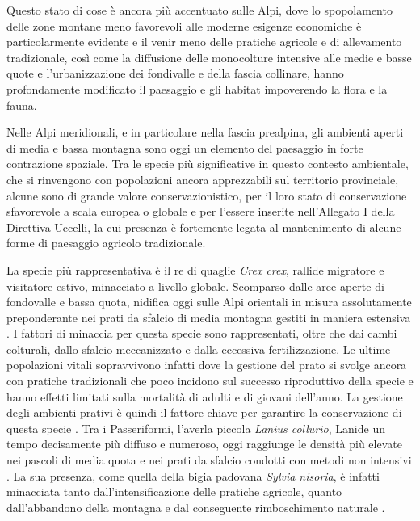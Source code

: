 \documentclass[10pt,twoside,openany,x11names,svgnames,italian,a5paper,dvipsnames,table]{memoir}
\begin{document}
Questo stato di cose è ancora più accentuato sulle Alpi, dove lo spopolamento delle zone montane meno favorevoli alle moderne esigenze economiche è particolarmente evidente e il venir meno delle pratiche agricole e di allevamento
tradizionale, così come la diffusione delle monocolture intensive alle medie e basse quote e l’urbanizzazione dei fondivalle e della fascia collinare, hanno profondamente modificato il paesaggio e gli habitat impoverendo la flora e la fauna.

 Nelle Alpi meridionali, e in particolare nella fascia prealpina, gli ambienti aperti di media e bassa montagna sono oggi un elemento del paesaggio in forte contrazione spaziale. Tra le specie più significative in questo contesto ambientale, che si rinvengono con popolazioni ancora apprezzabili sul territorio provinciale, alcune sono di grande valore conservazionistico, per il loro stato di conservazione sfavorevole a scala europea o globale e per l'essere inserite nell'Allegato I della Direttiva Uccelli, la cui presenza è fortemente legata al mantenimento di alcune forme di paesaggio agricolo tradizionale. 

La specie più rappresentativa è il re di quaglie \emph{Crex crex}, rallide migratore e visitatore estivo, minacciato a livello globale. Scomparso dalle aree aperte di fondovalle e bassa quota, nidifica oggi sulle Alpi orientali in misura assolutamente preponderante nei prati da sfalcio di media montagna gestiti in maniera estensiva \cite{Pedrini02} \cite{Pedrini05} \cite{Pedrini12}. I fattori di minaccia per questa specie sono rappresentati, oltre che dai cambi colturali, dallo sfalcio meccanizzato e dalla eccessiva fertilizzazione. Le ultime popolazioni vitali sopravvivono infatti dove la gestione del prato si svolge ancora con pratiche tradizionali che poco incidono sul successo riproduttivo della specie e hanno effetti limitati sulla mortalità di adulti e di giovani dell’anno. La gestione degli ambienti prativi è quindi il fattore chiave per garantire la conservazione di questa specie \cite{Broyer96} \cite{Crockford96} \cite{Brambilla13}. Tra i Passeriformi, l’averla piccola \emph{Lanius collurio}, Lanide un tempo decisamente più diffuso e numeroso, oggi raggiunge le densità più elevate nei pascoli di media quota e nei prati da sfalcio condotti con metodi non intensivi \cite{Brambilla09}. La sua presenza, come quella della bigia padovana \emph{Sylvia nisoria}, è infatti minacciata tanto dall’intensificazione delle pratiche agricole, quanto dall’abbandono della montagna e dal conseguente rimboschimento naturale \cite{Brambilla07} \cite{Brambilla10}. 
\end{document}
